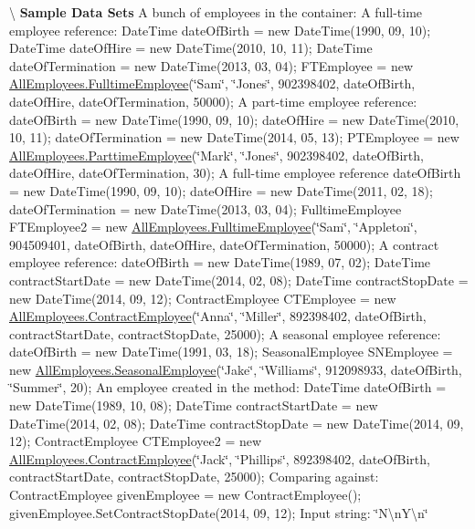 \textbackslash{} {\bfseries  Sample Data Sets} A bunch of employees in the container\+: A full-\/time employee reference\+: Date\+Time date\+Of\+Birth = new Date\+Time(1990, 09, 10); Date\+Time date\+Of\+Hire = new Date\+Time(2010, 10, 11); Date\+Time date\+Of\+Termination = new Date\+Time(2013, 03, 04); F\+T\+Employee = new \hyperlink{class_all_employees_1_1_fulltime_employee}{All\+Employees.\+Fulltime\+Employee}(\char`\"{}\+Sam\char`\"{}, \char`\"{}\+Jones\char`\"{}, 902398402, date\+Of\+Birth, date\+Of\+Hire, date\+Of\+Termination, 50000); A part-\/time employee reference\+: date\+Of\+Birth = new Date\+Time(1990, 09, 10); date\+Of\+Hire = new Date\+Time(2010, 10, 11); date\+Of\+Termination = new Date\+Time(2014, 05, 13); P\+T\+Employee = new \hyperlink{class_all_employees_1_1_parttime_employee}{All\+Employees.\+Parttime\+Employee}(\char`\"{}\+Mark\char`\"{}, \char`\"{}\+Jones\char`\"{}, 902398402, date\+Of\+Birth, date\+Of\+Hire, date\+Of\+Termination, 30); A full-\/time employee reference date\+Of\+Birth = new Date\+Time(1990, 09, 10); date\+Of\+Hire = new Date\+Time(2011, 02, 18); date\+Of\+Termination = new Date\+Time(2013, 03, 04); Fulltime\+Employee F\+T\+Employee2 = new \hyperlink{class_all_employees_1_1_fulltime_employee}{All\+Employees.\+Fulltime\+Employee}(\char`\"{}\+Sam\char`\"{}, \char`\"{}\+Appleton\char`\"{}, 904509401, date\+Of\+Birth, date\+Of\+Hire, date\+Of\+Termination, 50000); A contract employee reference\+: date\+Of\+Birth = new Date\+Time(1989, 07, 02); Date\+Time contract\+Start\+Date = new Date\+Time(2014, 02, 08); Date\+Time contract\+Stop\+Date = new Date\+Time(2014, 09, 12); Contract\+Employee C\+T\+Employee = new \hyperlink{class_all_employees_1_1_contract_employee}{All\+Employees.\+Contract\+Employee}(\char`\"{}\+Anna\char`\"{}, \char`\"{}\+Miller\char`\"{}, 892398402, date\+Of\+Birth, contract\+Start\+Date, contract\+Stop\+Date, 25000); A seasonal employee reference\+: date\+Of\+Birth = new Date\+Time(1991, 03, 18); Seasonal\+Employee S\+N\+Employee = new \hyperlink{class_all_employees_1_1_seasonal_employee}{All\+Employees.\+Seasonal\+Employee}(\char`\"{}\+Jake\char`\"{}, \char`\"{}\+Williams\char`\"{}, 912098933, date\+Of\+Birth, \char`\"{}\+Summer\char`\"{}, 20); An employee created in the method\+: Date\+Time date\+Of\+Birth = new Date\+Time(1989, 10, 08); Date\+Time contract\+Start\+Date = new Date\+Time(2014, 02, 08); Date\+Time contract\+Stop\+Date = new Date\+Time(2014, 09, 12); Contract\+Employee C\+T\+Employee2 = new \hyperlink{class_all_employees_1_1_contract_employee}{All\+Employees.\+Contract\+Employee}(\char`\"{}\+Jack\char`\"{}, \char`\"{}\+Phillips\char`\"{}, 892398402, date\+Of\+Birth, contract\+Start\+Date, contract\+Stop\+Date, 25000); Comparing against\+: Contract\+Employee given\+Employee = new Contract\+Employee(); given\+Employee.\+Set\+Contract\+Stop\+Date(2014, 09, 12); Input string\+: \char`\"{}\+N\textbackslash{}n\+Y\textbackslash{}n\char`\"{}

